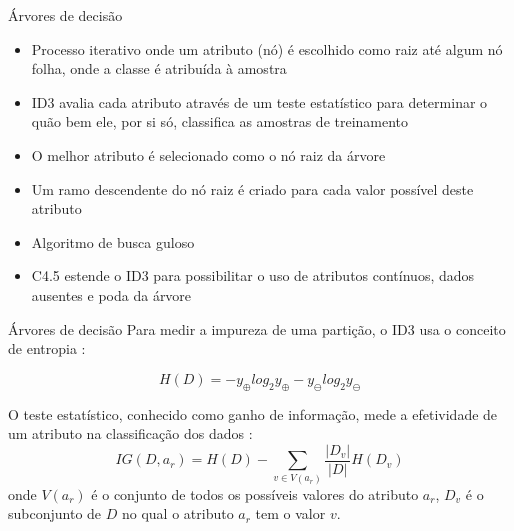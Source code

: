 \begin{frame}{Árvores de decisão}
\begin{itemize}
    \item Processo iterativo onde um atributo (nó) é escolhido como raiz até algum nó folha, onde a classe é atribuída à amostra
    \item ID3 avalia cada atributo através de um teste estatístico para determinar o quão bem ele, por si só, classifica as amostras de treinamento \citep{quinlan:86}
    \item O melhor atributo é selecionado como o nó raiz da árvore
    \item Um ramo descendente do nó raiz é criado para cada valor possível deste atributo \citep{mitchell:97}
    \item Algoritmo de busca guloso \citep{mitchell:97}
    \item C4.5 estende o ID3 para possibilitar o uso de atributos contínuos, dados ausentes e poda da árvore \citet{quinlan:93}
\end{itemize}
\end{frame}

\begin{frame}{Árvores de decisão}
Para medir a impureza de uma partição, o ID3 usa o conceito de entropia \citep{quinlan:86}:

\begin{equation*}
H(D) = - y_\oplus log_2 y_\oplus - y_\ominus log_2 y_\ominus
\end{equation*}

O teste estatístico, conhecido como ganho de informação, mede a efetividade de um atributo na classificação dos dados \citep{quinlan:86}:
\begin{equation*}
IG(D, a_r) = H(D) - \sum_{v \in V(a_r)} \frac{|D_v|}{|D|} H(D_v)
\end{equation*}
\noindent onde $V(a_r)$ é o conjunto de todos os possíveis valores do atributo $a_r$, $D_v$ é o subconjunto de $D$ no qual o atributo $a_r$ tem o valor $v$.

\end{frame}